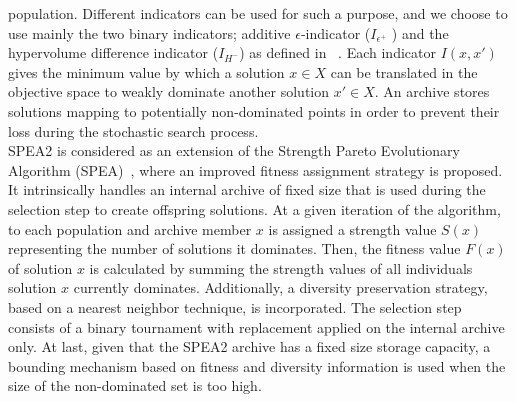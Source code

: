 \documentclass{llncs}
\begin{document}
population. Different indicators can be used for such a purpose, and we choose to use mainly the two binary indicators; additive $\epsilon$-indicator ($I_{\epsilon^+}$ ) and the hypervolume
difference indicator ($I_{H^-}$)  as defined in ~\cite{Zitzler2004}. 
Each indicator  $I (x, x')$ gives the minimum value by which a solution $x \in X$  can be translated in the objective space to weakly dominate
another solution $x' \in X$. 
An archive stores solutions mapping to potentially non-dominated points in order to prevent their loss during the stochastic search process. \\
\indent SPEA2 is considered as an extension of the Strength Pareto Evolutionary Algorithm (SPEA)~\cite{Zitzler2002}, where an improved fitness assignment strategy is proposed. It intrinsically handles an internal archive of fixed size that is used during
the selection step to create offspring solutions. At a given iteration of the algorithm, to each population and archive member $x$ is assigned a strength value $S(x)$ representing the number
of solutions it dominates. Then, the fitness value $F (x)$ of solution $x$ is calculated by summing the strength values of all individuals solution $x$ currently dominates. Additionally,
a diversity preservation strategy, based on a nearest neighbor technique, is incorporated.
The selection step consists of a binary tournament with replacement applied on the internal archive only.
At last, given that the SPEA2 archive has a fixed size storage capacity, a bounding mechanism based on fitness and diversity information is used when the size of
the non-dominated set is too high. %
\end{document}
